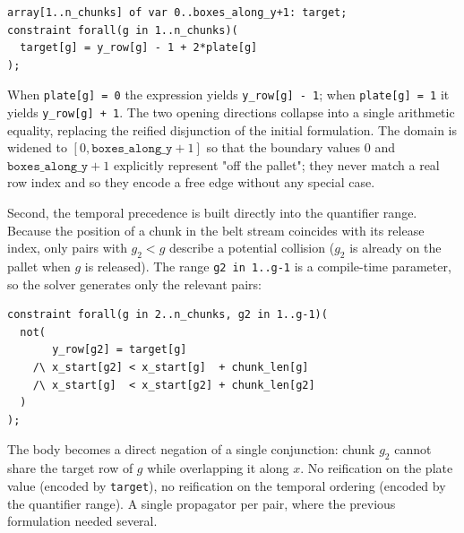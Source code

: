 \vspace{0.5cm}
\begin{lstlisting}
array[1..n_chunks] of var 0..boxes_along_y+1: target;
constraint forall(g in 1..n_chunks)(
  target[g] = y_row[g] - 1 + 2*plate[g]
);
\end{lstlisting}
\vspace{0.5cm}

When \texttt{plate[g] = 0} the expression yields \texttt{y\_row[g] - 1};
when \texttt{plate[g] = 1} it yields \texttt{y\_row[g] + 1}. The two
opening directions collapse into a single arithmetic equality, replacing
the reified disjunction of the initial formulation. The domain is widened
to \([0, \texttt{boxes\_along\_y}+1]\) so that the boundary values \(0\)
and \(\texttt{boxes\_along\_y}+1\) explicitly represent "off the pallet";
they never match a real row index and so they encode a free edge without
any special case.

Second, the temporal precedence is built directly into the quantifier
range. Because the position of a chunk in the belt stream coincides with
its release index, only pairs with \(g_2 < g\) describe a potential
collision (\(g_2\) is already on the pallet when \(g\) is released). The
range \texttt{g2 in 1..g-1} is a compile-time parameter, so the solver
generates only the relevant pairs:

\vspace{0.5cm}
\begin{lstlisting}
constraint forall(g in 2..n_chunks, g2 in 1..g-1)(
  not(
       y_row[g2] = target[g]
    /\ x_start[g2] < x_start[g]  + chunk_len[g]
    /\ x_start[g]  < x_start[g2] + chunk_len[g2]
  )
);
\end{lstlisting}
\vspace{0.5cm}

The body becomes a direct negation of a single conjunction: chunk \(g_2\)
cannot share the target row of \(g\) while overlapping it along \(x\). No
reification on the plate value (encoded by \texttt{target}), no
reification on the temporal ordering (encoded by the quantifier range).
A single propagator per pair, where the previous formulation needed
several.